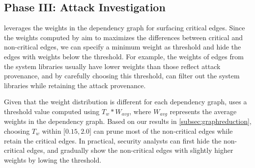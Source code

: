 \subsection{Phase III: Attack Investigation}
\label{subsec:reputation-propagation}

\tool leverages the weights in the dependency graph for surfacing critical edges.
Since the weights computed by \tool aim to maximizes the differences between critical and non-critical edges, we can specify a minimum weight as threshold and hide the edges with weights below the threshold.
For example, the weights of edges from the system libraries usually have lower weights than those reflect attack provenance, 
and by carefully choosing this threshold, \tool can filter out the system libraries while retaining the attack provenance.

Given that the weight distribution is different for each dependency graph, \tool uses a threshold value computed using $T_w * W_{avg}$, where $W_{avg}$ represents the average weights in the dependency graph.
Based on our results in \cref{subsec:graphreduction}, choosing $T_w$ within $\lbrack 0.15,2.0 \rbrack$ can prune most of the non-critical edges while retain the critical edges. 
In practical, security analysts can first hide the non-critical edges, and gradually show the non-critical edges with slightly higher weights by lowing the threshold. 



